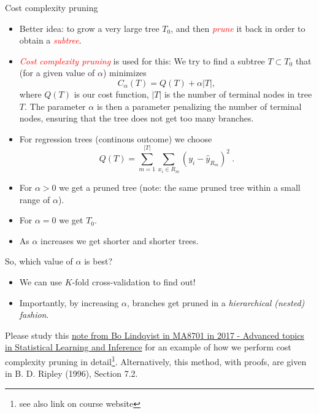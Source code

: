 \documentclass[
  10pt,
  ignorenonframetext,
]{beamer}
\providecommand{\tightlist}{%
  \setlength{\itemsep}{0pt}\setlength{\parskip}{0pt}}
\begin{document}
\begin{frame}
\begin{block}{Cost complexity pruning}
\protect\hypertarget{cost-complexity-pruning}{}
\(~\)

\begin{itemize}
\tightlist
\item
  Better idea: to grow a very large tree \(T_0\), and then
  \emph{\textcolor{red}{prune}} it back in order to obtain a
  \emph{\textcolor{red}{subtree}}.
\end{itemize}

\vspace{2mm}

\begin{itemize}
\tightlist
\item
  \emph{\textcolor{red}{Cost complexity pruning}} is used for this: We
  try to find a subtree \(T\subset T_0\) that (for a given value of
  \(\alpha\)) minimizes \[
  C_{\alpha}(T)=Q(T)+\alpha |T|,
  \] where \(Q(T)\) is our cost function, \(|T|\) is the number of
  terminal nodes in tree \(T\). The parameter \(\alpha\) is then a
  parameter penalizing the number of terminal nodes, ensuring that the
  tree does not get too many branches.
\end{itemize}

\vspace{2mm}

\begin{itemize}
\tightlist
\item
  For regression trees (continous outcome) we choose
  \[Q(T)=\sum_{m=1}^{|T|}\sum_{x_i\in R_m}(y_i - \hat{y}_{R_m})^2 \ .\]
\end{itemize}
\end{block}
\end{frame}

\begin{frame}
\begin{itemize}
\item
  For \(\alpha>0\) we get a pruned tree (note: the same pruned tree
  within a small range of \(\alpha\)).
\item
  For \(\alpha=0\) we get \(T_0\).
\item
  As \(\alpha\) increases we get shorter and shorter trees.
\end{itemize}

So, which value of \(\alpha\) is best?

\begin{itemize}
\item
  We can use \(K\)-fold cross-validation to find out!
\item
  Importantly, by increasing \(\alpha\), branches get pruned in a
  \emph{hierarchical (nested) fashion}.
\end{itemize}

Please study this
\href{https://www.math.ntnu.no/emner/TMA4268/2018v/notes/CART1MA87012017BoLindqvist.pdf}{note
from Bo Lindqvist in MA8701 in 2017 - Advanced topics in Statistical
Learning and Inference} for an example of how we perform cost complexity
pruning in detail\footnote{see also link on course website}.
Alternatively, this method, with proofs, are given in B. D. Ripley
(1996), Section 7.2.
\end{frame}
\end{document}
